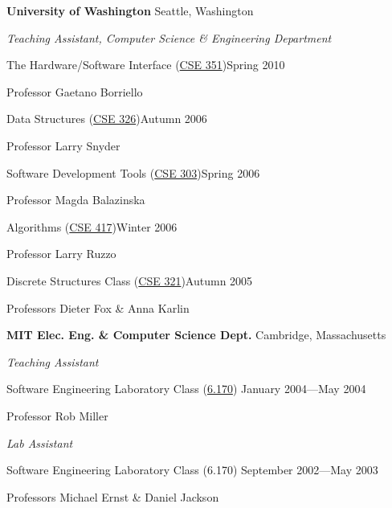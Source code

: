 \documentclass[letter]{article}
\begin{document}
\vspace{\baselineskip}

{\bf University of Washington} \hfill Seattle, Washington

\par
{\em Teaching Assistant, Computer Science \& Engineering Department}

\vspace{0.5\baselineskip}
\par
The Hardware/Software Interface (\href{http://www.cs.washington.edu/education/courses/351/10sp/}{CSE 351})\hfill Spring 2010
\par
Professor Gaetano Borriello

\vspace{0.5\baselineskip}
\par
Data Structures (\href{http://www.cs.washington.edu/education/courses/326/06au/}{CSE 326})\hfill Autumn 2006
\par
Professor Larry Snyder

\vspace{0.5\baselineskip}
\par
Software Development Tools (\href{http://www.cs.washington.edu/education/courses/303/06sp/}{CSE 303})\hfill Spring 2006
\par
Professor Magda Balazinska

\vspace{0.5\baselineskip}
\par
Algorithms (\href{http://www.cs.washington.edu/education/courses/417/06wi/}{CSE 417})\hfill Winter 2006
\par
Professor Larry Ruzzo

\vspace{0.5\baselineskip}
\par
Discrete Structures Class (\href{http://www.cs.washington.edu/education/courses/321/05au/}{CSE 321})\hfill Autumn 2005
\par
Professors Dieter Fox \& Anna Karlin
\par

\vspace{\baselineskip}
\par
{\bf MIT Elec. Eng. \& Computer Science Dept.} \hfill Cambridge, Massachusetts

\vspace{0.5\baselineskip}
\par
{\em Teaching Assistant}
\par
Software Engineering Laboratory Class (\href{http://courses.csail.mit.edu/6.170/old-www/2004-Spring/admin-info/generalinfo.html#Staff}{6.170}) \hfill January 2004---May 2004
\par
Professor Rob Miller

\vspace{0.5\baselineskip}
\par
{\em Lab Assistant}
\par
Software Engineering Laboratory Class (6.170) \hfill September 2002---May 2003
\par
Professors Michael Ernst \& Daniel Jackson
\par
\end{document}
